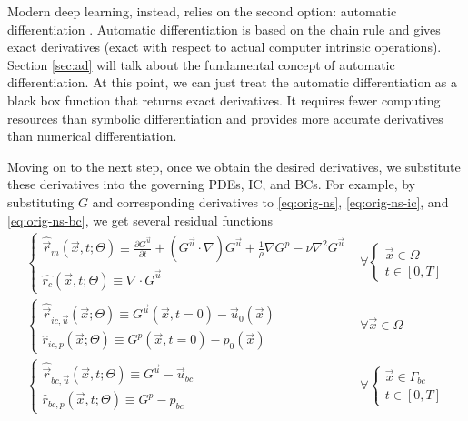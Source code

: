 Modern deep learning, instead, relies on the second option: automatic differentiation \cite{griewank_automatic_1988}.
Automatic differentiation is based on the chain rule and gives exact derivatives (exact with respect to actual computer intrinsic operations).
Section \ref{sec:ad} will talk about the fundamental concept of automatic differentiation.
At this point, we can just treat the automatic differentiation as a black box function that returns exact derivatives.
It requires fewer computing resources than symbolic differentiation and provides more accurate derivatives than numerical differentiation.

Moving on to the next step, once we obtain the desired derivatives, we substitute these derivatives into the governing PDEs, IC, and BCs.
For example, by substituting $G$ and corresponding derivatives to \eqref{eq:orig-ns}, \eqref{eq:orig-ns-ic}, and \eqref{eq:orig-ns-bc}, we get several residual functions
\begin{equation}\label{eq:residuals}
    \begin{array}{ll}
        \left\{
            \begin{array}{l}
            \hat{\vec{r}}_{m}(\vec{x}, t; \Theta) \equiv \frac{\partial G^{\vec{u}}}{\partial t}+(G^{\vec{u}} \cdot \nabla) G^{\vec{u}}+\frac{1}{\rho} \nabla G^p -\nu \nabla^{2} G^{\vec{u}} \\
            \hat{r_{c}}(\vec{x}, t; \Theta) \equiv \nabla \cdot G^{\vec{u}} 
            \end{array}
        \right. &
        \forall
        \left\{
            \begin{array}{l}
                \vec{x} \in \Omega \\ t \in [0, T]
            \end{array}
        \right. \\
        \left\{
            \begin{array}{l}
            \hat{\vec{r}}_{ic,\vec{u}}(\vec{x}; \Theta) \equiv G^{\vec{u}}(\vec{x}, t=0)-\vec{u}_0(\vec{x}) \\
            \hat{r}_{ic,p}(\vec{x}; \Theta) \equiv G^{p}(\vec{x}, t=0)-p_0(\vec{x})
            \end{array}
        \right. &
        \forall
        \vec{x} \in \Omega \\
        \left\{
            \begin{array}{l}
            \hat{\vec{r}}_{bc,\vec{u}}(\vec{x}, t; \Theta) \equiv G^{\vec{u}}-\vec{u}_{bc} \\
            \hat{r}_{bc,p}(\vec{x}, t; \Theta) \equiv G^{p}-p_{bc}
            \end{array}
        \right. &
        \forall
        \left\{
            \begin{array}{l}
                \vec{x} \in \Gamma_{bc} \\ t \in [0, T]
            \end{array}
        \right.
    \end{array}
\end{equation}
